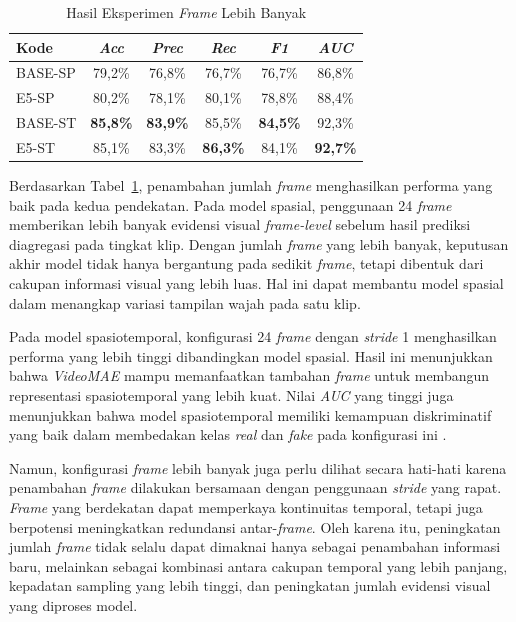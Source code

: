 \begin{table}[htbp]
\centering
\caption{Hasil Eksperimen \textit{Frame} Lebih Banyak}
\label{table:4.eksperimen-utama-frame-banyak}
\begin{tabular}{lccccc}
\toprule
\textbf{Kode} &
\textbf{\textit{Acc}} &
\textbf{\textit{Prec}} &
\textbf{\textit{Rec}} &
\textbf{\textit{F1}} &
\textbf{\textit{AUC}} \\
\midrule
BASE-SP & 79,2\% & 76,8\% & 76,7\% & 76,7\% & 86,8\% \\
E5-SP & 80,2\% & 78,1\% & 80,1\% & 78,8\% & 88,4\% \\
\midrule
BASE-ST & \textbf{85,8\%} & \textbf{83,9\%} & 85,5\% & \textbf{84,5\%} & 92,3\% \\
E5-ST & 85,1\% & 83,3\% & \textbf{86,3\%} & 84,1\% & \textbf{92,7\%} \\
\bottomrule
\end{tabular}
\end{table}

Berdasarkan Tabel~\ref{table:4.eksperimen-utama-frame-banyak}, penambahan jumlah \textit{frame} menghasilkan performa yang baik pada kedua pendekatan. Pada model spasial, penggunaan 24 \textit{frame} memberikan lebih banyak evidensi visual \textit{frame-level} sebelum hasil prediksi diagregasi pada tingkat klip. Dengan jumlah \textit{frame} yang lebih banyak, keputusan akhir model tidak hanya bergantung pada sedikit \textit{frame}, tetapi dibentuk dari cakupan informasi visual yang lebih luas. Hal ini dapat membantu model spasial dalam menangkap variasi tampilan wajah pada satu klip.

Pada model spasiotemporal, konfigurasi 24 \textit{frame} dengan \textit{stride} 1 menghasilkan performa yang lebih tinggi dibandingkan model spasial. Hasil ini menunjukkan bahwa \textit{VideoMAE} mampu memanfaatkan tambahan \textit{frame} untuk membangun representasi spasiotemporal yang lebih kuat. Nilai \textit{AUC} yang tinggi juga menunjukkan bahwa model spasiotemporal memiliki kemampuan diskriminatif yang baik dalam membedakan kelas \textit{real} dan \textit{fake} pada konfigurasi ini \cite{Gu2021}\cite{KINGRA2024301817}\cite{tong2022videomaemaskedautoencodersdataefficient}.

Namun, konfigurasi \textit{frame} lebih banyak juga perlu dilihat secara hati-hati karena penambahan \textit{frame} dilakukan bersamaan dengan penggunaan \textit{stride} yang rapat. \textit{Frame} yang berdekatan dapat memperkaya kontinuitas temporal, tetapi juga berpotensi meningkatkan redundansi antar-\textit{frame}. Oleh karena itu, peningkatan jumlah \textit{frame} tidak selalu dapat dimaknai hanya sebagai penambahan informasi baru, melainkan sebagai kombinasi antara cakupan temporal yang lebih panjang, kepadatan sampling yang lebih tinggi, dan peningkatan jumlah evidensi visual yang diproses model.

